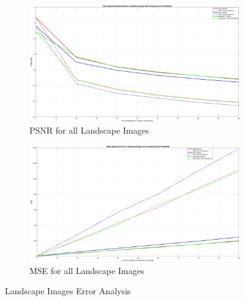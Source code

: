 \documentclass[landscape,a0paper,fontscale=0.4]{baposter} %
\begin{document}
\begin{poster}
{\vspace{-1em}
\begin{figure}[H]
\centering
	\begin{subfigure}{0.4\textwidth} %
		\includegraphics[scale=0.06]{PSNRLandscape}
		\caption{PSNR for all Landscape Images} %
	\end{subfigure}
	\vspace{1em} %
	\begin{subfigure}{0.4\textwidth} %
		\includegraphics[scale=0.06]{MSELandscape}
		\caption{MSE for all Landscape Images} %
	\end{subfigure}
	\vspace{-2em}
	\caption{Landscape Images Error Analysis}
	\label{fig: Landscape Error} %
\end{figure}


}
\end{poster}
\end{document}
